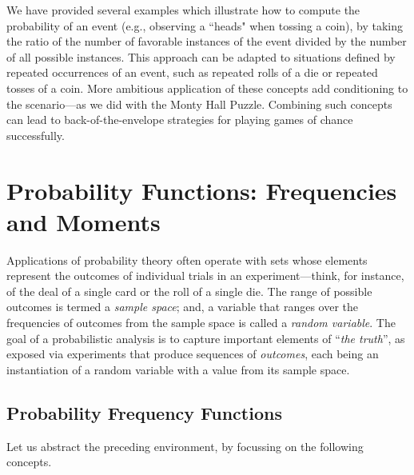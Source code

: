 \medskip


We have provided several examples which illustrate how to compute the probability of an event
(e.g., observing a ``heads" when tossing a coin), by taking the ratio of the number of favorable 
instances of the event divided by the number of all possible instances. This approach can be adapted to situations defined by repeated occurrences of an event, such as repeated rolls of a  die or repeated tosses of a coin.  More ambitious application of these concepts add conditioning to the scenario---as we did with the Monty Hall Puzzle.  Combining such concepts can lead to back-of-the-envelope strategies for playing games of chance successfully.


\section{Probability Functions: Frequencies and Moments}
\label{sec:prob-distributions}
\label{sec:prob-freq-fns+measures}

 
 

Applications of probability theory often operate with sets whose elements represent the outcomes of individual trials in an experiment---think, for instance, of the deal of a single card or the roll of a single die.  The range of possible outcomes is termed a {\it sample space}; and, a variable that ranges over the frequencies of outcomes from the sample space is called a {\it random variable}.  The goal of a probabilistic analysis is to capture important elements of ``{\em the truth}'', as exposed via experiments that produce sequences of {\em outcomes}, each being an instantiation of a random variable with a value from its sample space.

\subsection{Probability Frequency Functions}
\label{sec:prob-freq-fns}

Let us abstract the preceding environment, by focussing on the following concepts.

